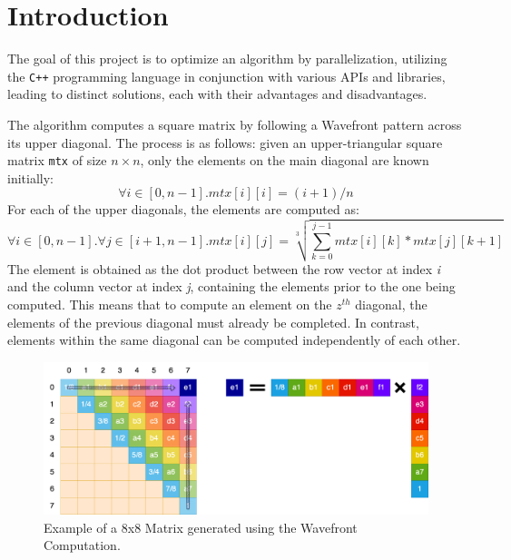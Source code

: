 \section*{Introduction}
The goal of this project is to optimize an algorithm by parallelization, utilizing the \texttt{C++} programming language in conjunction with various APIs and libraries, leading to distinct solutions, each with their advantages and disadvantages.
\par The algorithm computes a square matrix by following a Wavefront pattern across its upper diagonal. The process is as follows: given an upper-triangular square matrix \texttt{mtx} of size $n \times n$, only the elements on the main diagonal are known initially:
\begin{equation}
    \forall i \in [0, n - 1].mtx[i][i] = (i+1)/n  
\end{equation}
For each of the upper diagonals, the elements are computed as:
\begin{equation}
    \forall i \in [0, n - 1]. \forall j \in [i + 1, n - 1]. mtx[i][j] = \sqrt[3]{\sum_{k = 0}^{j - 1}mtx[i][k] * mtx[j][k + 1]}
\end{equation}
The element is obtained as the dot product between the row vector at index \textit{i} and the column vector at index \textit{j}, containing the elements prior to the one being computed. This means that to compute an element on the $\textit{z}^{th}$ diagonal, the elements of the previous diagonal must already be completed. In contrast, elements within the same diagonal can be computed independently of each other.

\begin{figure}[h]
    \centering\includegraphics[scale=0.20]{img/Introduction/WaveFrontExample.png}
    
    \caption{Example of a 8x8 Matrix generated using the Wavefront Computation.}
\end{figure}
